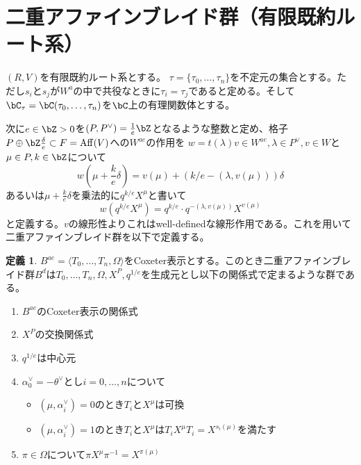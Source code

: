 \documentclass[uplatex, a4paper, dvipdfmx]{jsarticle}
\theoremstyle{definition}
\newtheorem{definition}[theorem]{定義}
\DeclareMathOperator{\Aff}{\mathrm{Aff}}
\begin{document}
\section{二重アファインブレイド群（有限既約ルート系）}
$(R, V)$を有限既約ルート系とする。
$\tau =\{\tau_0, \dots, \tau_n\}$を不定元の集合とする。ただし$s_i$と$s_j$が$W^a$の中で共役なときに$\tau_i = \tau_j$であると定める。そして$\bC_\tau = \bC(\tau_0, \dots, \tau_n)$を$\bC$上の有理関数体とする。

次に$e \in \bZ>0$を$(P, P^\vee) = \frac{1}{e}\bZ$となるような整数と定め、格子$P \oplus \bZ \frac{\delta}{e} \subset F = \Aff(V)$への$W^{ae}$の作用を
$w = t(\lambda)v \in W^{ae}, \lambda \in P^\vee, v \in W$と$\mu \in P, k \in \bZ$について
\begin{equation}
    w\left(\mu + \frac{k}{e} \delta\right) = v(\mu) +\left(k/e - (\lambda, v(\mu))\right)\delta
\end{equation}
あるいは$\mu + \frac{k}{e} \delta$を乗法的に$q^{k/e} X^\mu$と書いて
\begin{equation}
    w(q^{k/e}X^\mu) = q^{k/e} \cdot q^{-(\lambda, v(\mu))}X^{v(\mu)}
\end{equation}
と定義する。$v$の線形性よりこれはwell-definedな線形作用である。これを用いて二重アファインブレイド群を以下で定義する。
\begin{definition}
    $B^{ae} = \langle T_0, \dots, T_n, \Omega\rangle$をCoxeter表示とする。このとき二重アファインブレイド群$B^d$は$T_0, \dots, T_n, \Omega, X^P, q^{1/e}$を生成元とし以下の関係式で定まるような群である。
    \begin{enumerate}
        \item $B^{ae}$のCoxeter表示の関係式
        \item $X^P$の交換関係式
        \item $q^{1/e}$は中心元
        \item $\alpha_0^\vee = -\theta^\vee$とし$i = 0, \dots, n$について
              \begin{itemize}
                  \item $(\mu, \alpha_i^\vee) = 0$のとき$T_i$と$X^\mu$は可換
                  \item $(\mu, \alpha_i^\vee) = 1$のとき$T_i$と$X^\mu$は$T_iX^\mu T_i = X^{s_i(\mu)}$を満たす
              \end{itemize}
        \item $\pi \in \Omega$について$\pi X^\mu \pi^{-1} = X^{\pi(\mu)}$
    \end{enumerate}
\end{definition}
\end{document}
